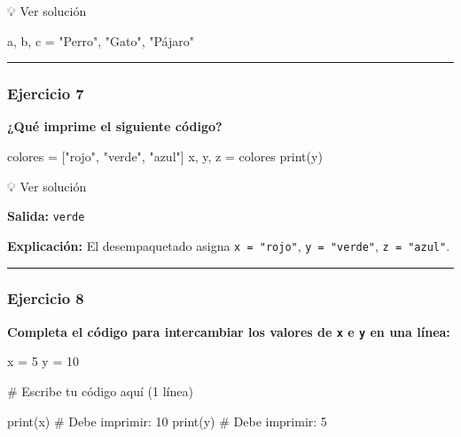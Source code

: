 \documentclass[
  doc,
  floatsintext,
  longtable,
  a4paper,
  nolmodern,
  notxfonts,
  notimes,
  12pt,
  colorlinks=true,linkcolor=blue,citecolor=blue,urlcolor=blue]{apa7}
\newenvironment{Shaded}{\begin{snugshade}}{\end{snugshade}}
\newcommand{\BuiltInTok}[1]{\textcolor[rgb]{0.00,0.23,0.31}{#1}}
\newcommand{\CommentTok}[1]{\textcolor[rgb]{0.37,0.37,0.37}{#1}}
\newcommand{\DecValTok}[1]{\textcolor[rgb]{0.68,0.00,0.00}{#1}}
\newcommand{\NormalTok}[1]{\textcolor[rgb]{0.00,0.23,0.31}{#1}}
\newcommand{\OperatorTok}[1]{\textcolor[rgb]{0.37,0.37,0.37}{#1}}
\newcommand{\StringTok}[1]{\textcolor[rgb]{0.13,0.47,0.30}{#1}}
\begin{document}
💡 Ver solución

\begin{Shaded}
\begin{Highlighting}[]
\NormalTok{a, b, c }\OperatorTok{=} \StringTok{"Perro"}\NormalTok{, }\StringTok{"Gato"}\NormalTok{, }\StringTok{"Pájaro"}
\end{Highlighting}
\end{Shaded}

\begin{center}\rule{0.5\linewidth}{0.5pt}\end{center}

\subsubsection{Ejercicio 7}\label{ejercicio-7}

\textbf{¿Qué imprime el siguiente código?}

\begin{Shaded}
\begin{Highlighting}[]
\NormalTok{colores }\OperatorTok{=}\NormalTok{ [}\StringTok{"rojo"}\NormalTok{, }\StringTok{"verde"}\NormalTok{, }\StringTok{"azul"}\NormalTok{]}
\NormalTok{x, y, z }\OperatorTok{=}\NormalTok{ colores}
\BuiltInTok{print}\NormalTok{(y)}
\end{Highlighting}
\end{Shaded}

💡 Ver solución

\textbf{Salida:} \texttt{verde}

\textbf{Explicación:} El desempaquetado asigna \texttt{x\ =\ "rojo"},
\texttt{y\ =\ "verde"}, \texttt{z\ =\ "azul"}.

\begin{center}\rule{0.5\linewidth}{0.5pt}\end{center}

\subsubsection{Ejercicio 8}\label{ejercicio-8}

\textbf{Completa el código para intercambiar los valores de \texttt{x} e
\texttt{y} en una línea:}

\begin{Shaded}
\begin{Highlighting}[]
\NormalTok{x }\OperatorTok{=} \DecValTok{5}
\NormalTok{y }\OperatorTok{=} \DecValTok{10}

\CommentTok{\# Escribe tu código aquí (1 línea)}

\BuiltInTok{print}\NormalTok{(x)  }\CommentTok{\# Debe imprimir: 10}
\BuiltInTok{print}\NormalTok{(y)  }\CommentTok{\# Debe imprimir: 5}
\end{Highlighting}
\end{Shaded}
\end{document}
